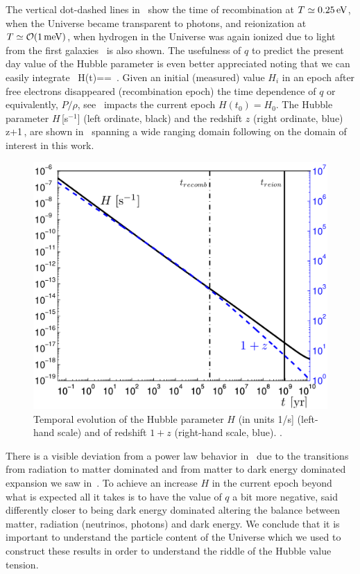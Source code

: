 The vertical dot-dashed lines in~ show the time of recombination at $T\simeq0.25\text{\,eV}$, when the Universe became transparent to photons, and reionization at $T\simeq {\cal O}(1\meV)$, when hydrogen in the Universe was again ionized due to light from the first galaxies~\cite{Zaroubi:2012in} is also shown. The usefulness of $q$ to predict the present day value of the Hubble parameter is even better appreciated noting that we can easily integrate~ 
\beqn\label{eq:HdotInt}
H(t)==
\,.
\eeqn
Given an initial (measured) value $H_i$ in an epoch after free electrons disappeared (recombination epoch) the time dependence of $q$ or equivalently, $P/\rho$, see~ impacts the current epoch $H(t_0)=H_0$. The Hubble parameter 
$H$\,[s$^{-1}$] (left ordinate, black) and the redshift $z$ (right ordinate, blue) 
\beqn\label{eq:zdef}
z+1\equiv {}\,,
\eeqn
are shown in~ spanning a wide ranging domain following on the domain of interest in this work. 

\begin{figure}
\centerline{\includegraphics[width=0.65\linewidth]{plots/Hztoday.png}}
\caption{Temporal evolution of the Hubble parameter $H$ (in units 1/s] (left-hand scale) and of redshift $1+z$ (right-hand scale, blue). . 
\label{fig:today1} }
\end{figure}

There is a visible deviation from a power law behavior in~ due to the transitions from radiation to matter dominated and from matter to dark energy dominated expansion we saw in~. To achieve an increase $H$ in the current epoch beyond what is expected all it takes is to have the value of $q$ a bit more negative, said differently closer to being dark energy dominated altering the balance between matter, radiation (neutrinos, photons) and dark energy. We conclude that it is important to understand the particle content of the Universe which we used to construct these results in order to understand the riddle of the Hubble value tension.

